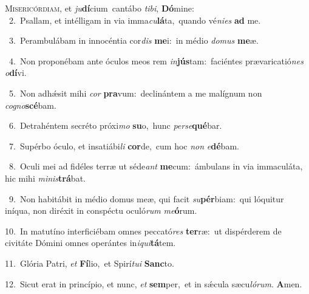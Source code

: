 \lettrine{\initial\textcolor{\initialcolor}{M}}{isericórdiam,} et \textit{ju}\-\textbf{dí}cium~\star cantábo \textit{ti}\-\textit{bi}, \textbf{Dó}\-mine:\\
{\numbfont\textcolor{\numbcolor}{~2.}}~Psallam, et intélligam in via imma\-\textit{cu}\-\textbf{lá}ta,~\star quando vé\-\textit{ni}\-\textit{es} \textbf{ad} me.\par
{\numbfont\textcolor{\numbcolor}{~3.}}~Perambulábam in innocéntia cor\textit{dis} \textbf{me}\-i:~\star in médio \textit{do}\-\textit{mus} \textbf{me}\-æ.\par
{\numbfont\textcolor{\numbcolor}{~4.}}~Non proponébam ante óculos meos rem \textit{in}\-\textbf{jús}tam:~\star faciéntes prævaricatió\textit{nes} \textit{o}\-\textbf{dí}vi.\par
{\numbfont\textcolor{\numbcolor}{~5.}}~Non adhǽsit mihi \textit{cor} \textbf{pra}\-vum:~\star declinántem a me malígnum non \textit{co}\-\textit{gno}\textbf{scé}bam.\par
{\numbfont\textcolor{\numbcolor}{~6.}}~Detrahéntem secréto próxi\textit{mo} \textbf{su}\-o,~\star hunc \textit{per}\-\textit{se}\textbf{qué}bar.\par
{\numbfont\textcolor{\numbcolor}{~7.}}~Supérbo óculo, et insatiábi\textit{li} \textbf{cor}\-de,~\star cum hoc \textit{non} \textit{e}\-\textbf{dé}bam.\par
{\numbfont\textcolor{\numbcolor}{~8.}}~Oculi mei ad fidéles terræ ut séde\textit{ant} \textbf{me}\-cum:~\star ámbulans in via immaculáta, hic mihi \textit{mi}\-\textit{nis}\textbf{trá}bat.\par
{\numbfont\textcolor{\numbcolor}{~9.}}~Non habitábit in médio domus meæ, qui facit \textit{su}\-\textbf{pér}biam:~\star qui lóquitur iníqua, non diréxit in conspéctu oculó\textit{rum} \textit{me}\-\textbf{ó}rum.\par
{\numbfont\textcolor{\numbcolor}{10.}}~In matutíno interficiébam omnes peccató\textit{res} \textbf{ter}\-ræ:~\star ut dispérderem de civitáte Dómini omnes operántes in\-\textit{i}\-\textit{qui}\textbf{tá}tem.\par
{\numbfont\textcolor{\numbcolor}{11.}}~Glória Patri, \textit{et} \textbf{Fí}\-lio,~\star et Spirí\-\textit{tu}\-\textit{i} \textbf{Sanc}\-to.\par
{\numbfont\textcolor{\numbcolor}{12.}}~Sicut erat in princípio, et nunc, \textit{et} \textbf{sem}\-per,~\star et in sǽcula sæcu\-\textit{ló}\-\textit{rum}. \textbf{A}\-men.\par
